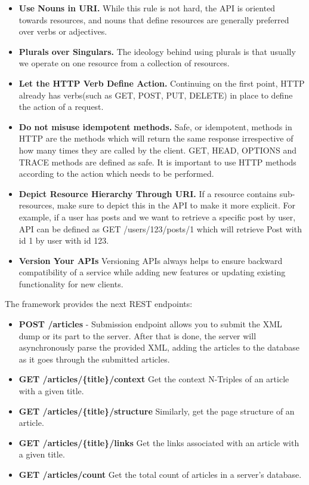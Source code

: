 \documentclass[thesis=M,english,hidelinks]{FITthesis}[2019/12/23]
\begin{document}
\begin{itemize}
	\item \textbf{Use Nouns in URI.} While this rule is not hard, the API is oriented towards resources, and nouns that define resources are generally preferred over verbs or adjectives.
	\item \textbf{Plurals over Singulars.} The ideology behind using plurals is that usually we operate on one resource from a collection of resources.
	\item \textbf{Let the HTTP Verb Define Action.} Continuing on the first point, HTTP already has verbs(such as GET, POST, PUT, DELETE) in place to define the action of a request.
	\item \textbf{Do not misuse idempotent methods.} Safe, or idempotent, methods in HTTP are the methods which will return the same response irrespective of how many times they are called by the client. GET, HEAD, OPTIONS and TRACE methods are defined as safe. It is important to use HTTP methods according to the action which needs to be performed.
	\item \textbf{Depict Resource Hierarchy Through URI.} If a resource contains sub-resources, make sure to depict this in the API to make it more explicit. For example, if a user has posts and we want to retrieve a specific post by user, API can be defined as GET /users/123/posts/1 which will retrieve Post with id 1 by user with id 123.
	\item \textbf{Version Your APIs} Versioning APIs always helps to ensure backward compatibility of a service while adding new features or updating existing functionality for new clients.
\end{itemize}

The framework provides the next \gls{REST} endpoints:

\begin{itemize}
	\item \textbf{POST /articles} - Submission endpoint allows you to submit the XML dump or its part to the server. After that is done, the server will asynchronously parse the provided XML, adding the articles to the database as it goes through the submitted articles.
	\item \textbf{GET /articles/\{title\}/context} Get the context N-Triples of an article with a given title.
	\item \textbf{GET /articles/\{title\}/structure} Similarly, get the page structure of an article.
	\item \textbf{GET /articles/\{title\}/links} Get the links associated with an article with a given title.
	\item \textbf{GET /articles/count} Get the total count of articles in a server's database.
\end{itemize}
\end{document}
